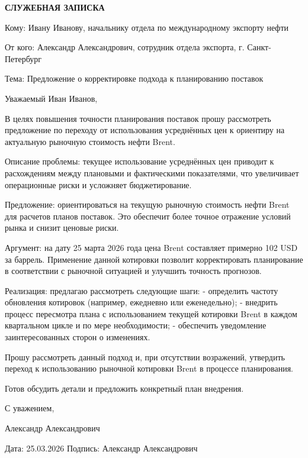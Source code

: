 \documentclass[12pt]{article}
\begin{document}
\begin{center}
\textbf{\LARGE СЛУЖЕБНАЯ ЗАПИСКА}
\end{center}

\vspace{1cm}

Кому: Ивану Иванову, начальнику отдела по международному экспорту нефти

От кого: Александр Александрович, сотрудник отдела экспорта, г. Санкт-Петербург

Тема: Предложение о корректировке подхода к планированию поставок

Уважаемый Иван Иванов,

В целях повышения точности планирования поставок прошу рассмотреть предложение по переходу от использования усреднённых цен к ориентиру на актуальную рыночную стоимость нефти Brent.

Описание проблемы: текущее использование усреднённых цен приводит к расхождениям между плановыми и фактическими показателями, что увеличивает операционные риски и усложняет бюджетирование.

Предложение: ориентироваться на текущую рыночную стоимость нефти Brent для расчетов планов поставок. Это обеспечит более точное отражение условий рынка и снизит ценовые риски.

Аргумент: на дату 25 марта 2026 года цена Brent составляет примерно 102 USD за баррель. Применение данной котировки позволит корректировать планирование в соответствии с рыночной ситуацией и улучшить точность прогнозов.

Реализация: предлагаю рассмотреть следующие шаги:
- определить частоту обновления котировок (например, ежедневно или еженедельно);
- внедрить процесс пересмотра плана с использованием текущей котировки Brent в каждом квартальном цикле и по мере необходимости;
- обеспечить уведомление заинтересованных сторон о изменениях.

Прошу рассмотреть данный подход и, при отсутствии возражений, утвердить переход к использованию рыночной котировки Brent в процессе планирования.

Готов обсудить детали и предложить конкретный план внедрения.

С уважением,

Александр Александрович

\vfill

\noindent
Дата: 25.03.2026 \hfill Подпись: Александр Александрович
\end{document}
